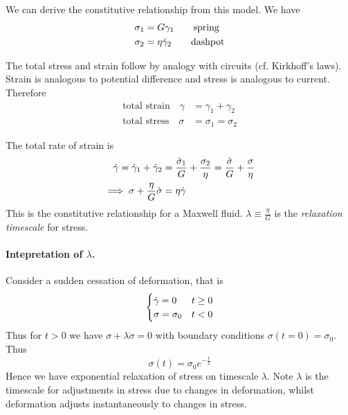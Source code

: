 \documentclass{jknotes}
\begin{document}
We can derive the constitutive relationship from this model. We have
\begin{align}
	\sigma_1 &= G \gamma_1 \hspace{2em} \text{spring}\\
	\sigma_2 &= \eta \dot{\gamma}_2 \hspace{2em} \text{dashpot} \\
\end{align}

The total stress and strain follow by analogy with circuits (cf. Kirkhoff's
laws). Strain is analogous to potential difference and stress is analogous to
current. Therefore
\begin{align}
	\text{total strain} \hspace{1em}  \gamma &= \gamma_1 + \gamma_2 \\
	\text{total stress}  \hspace{1em} \sigma &= \sigma_1 = \sigma_2
\end{align}

The total rate of strain is 
\begin{align}
	\dot{\gamma} = \dot{\gamma}_1 + \dot{\gamma}_2 &= \frac{\dot{\sigma}_1}{G} +
	\frac{\sigma_2}{\eta} = \frac{\dot{\sigma}}{G} + \frac{\sigma}{\eta}\\ 
	\implies \sigma + \frac{\eta}{G} \dot{\sigma} &= \eta \dot{\gamma}
\end{align}
This is the constitutive relationship for a Maxwell fluid. $\lambda \equiv
\frac{\eta}{G}$ is the \emph{relaxation timescale} for stress.

\paragraph{Intepretation of $\lambda$.} Consider a sudden cessation of
deformation, that is
\begin{equation}
	\begin{cases} \dot{\gamma} = 0 & t \ge 0 \\ \sigma = \sigma_0 & t < 0
	\end{cases}
\end{equation}
Thus for $t > 0$ we have $\sigma + \lambda \dot{\sigma} = 0$ with boundary
conditions $\sigma(t=0) = \sigma_0$. Thus
\begin{equation}
	\sigma(t) = \sigma_0 e^{-\frac{t}{\lambda}}
\end{equation}
Hence we have exponential relaxation of stress on timescale $\lambda$. Note
$\lambda$ is the timescale for adjustments in stress due to changes in
deformation, whilst deformation adjusts instantaneously to changes in stress.
\end{document}
